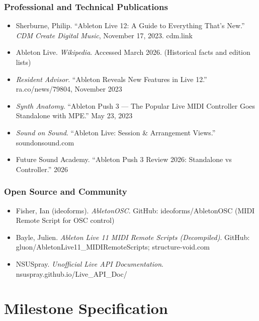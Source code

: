 \documentclass[11pt,letterpaper]{article}
\newcommand{\stageheader}[2]{%
  \noindent\colorbox{#2}{\makebox[\textwidth][l]{%
    \textcolor{white}{\bfseries\sffamily\hspace{6pt}#1\hspace{6pt}}}}%
  \vspace{0.5em}\par%
}
\begin{document}
\subsubsection{Professional and Technical Publications}
\begin{itemize}[leftmargin=1.5em]
  \item Sherburne, Philip. ``Ableton Live 12: A Guide to Everything That's New.'' \textit{CDM Create Digital Music}, November 17, 2023. cdm.link
  \item Ableton Live. \textit{Wikipedia}. Accessed March 2026. (Historical facts and edition lists)
  \item \textit{Resident Advisor}. ``Ableton Reveals New Features in Live 12.'' ra.co/news/79804, November 2023
  \item \textit{Synth Anatomy}. ``Ableton Push 3 --- The Popular Live MIDI Controller Goes Standalone with MPE.'' May 23, 2023
  \item \textit{Sound on Sound}. ``Ableton Live: Session \& Arrangement Views.'' soundonsound.com
  \item Future Sound Academy. ``Ableton Push 3 Review 2026: Standalone vs Controller.'' 2026
\end{itemize}

\subsubsection{Open Source and Community}
\begin{itemize}[leftmargin=1.5em]
  \item Fisher, Ian (ideoforms). \textit{AbletonOSC}. GitHub: ideoforms/AbletonOSC (MIDI Remote Script for OSC control)
  \item Bayle, Julien. \textit{Ableton Live 11 MIDI Remote Scripts (Decompiled)}. GitHub: gluon/AbletonLive11\_MIDIRemoteScripts; structure-void.com
  \item NSUSpray. \textit{Unofficial Live API Documentation}. nsuspray.github.io/Live\_API\_Doc/
\end{itemize}

\newpage
\stageheader{STAGE 3 --- MISSION PACKAGE}{tertiary}

\section{Milestone Specification}
\end{document}
